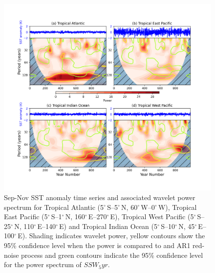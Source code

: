 \documentclass[wcd, manuscript]{copernicus}
\providecommand{\DIFaddendFL}{} %
\begin{document}
\begin{center}
\begin{figure}[h!]
\noindent\includegraphics[width = \linewidth]{new_changed_figures/SSTs_tropical_wavelet_new_levels.png}
\DIFaddendFL \caption{Sep-Nov SST anomaly time series and associated wavelet power spectrum for Tropical Atlantic (5$^{\circ}$\,S–5$^{\circ}$\,N, 60$^{\circ}$\,W–0$^{\circ}$\,W), Tropical East Pacific (5$^{\circ}$\,S–1$^{\circ}$\,N, 160$^{\circ}$\,E–270$^{\circ}$\,E), Tropical West Pacific (5$^{\circ}$\,S–25$^{\circ}$\,N, 110$^{\circ}$\,E–140$^{\circ}$\,E) and Tropical Indian Ocean (5$^{\circ}$\,S–10$^{\circ}$\,N, 45$^{\circ}$\,E–100$^{\circ}$\,E). Shading indicates wavelet power, yellow contours show the 95\% confidence level when the power is compared to and AR1 red-noise process and green contours indicate the 95\% confidence level for the power spectrum of $SSW_5yr$.}
\label{fig3}
\end{figure}
\end{center}
\end{document}
